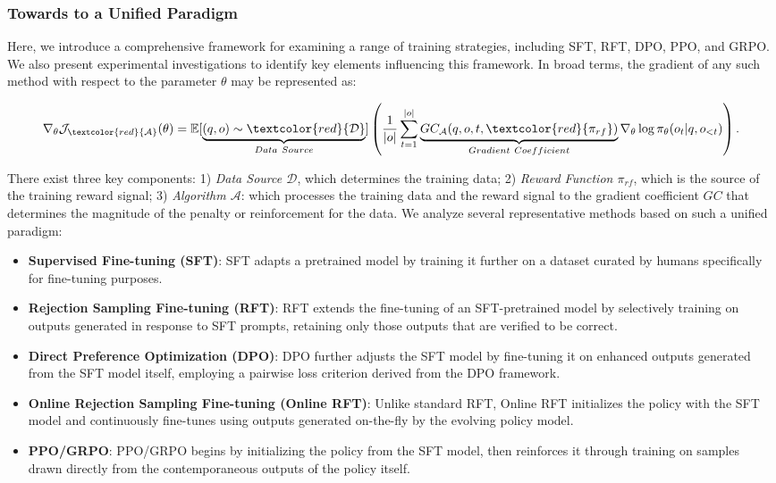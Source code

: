 \begin{itemize}[topsep=0pt]
\subsubsection{Towards to a Unified Paradigm} Here, we introduce a comprehensive framework for examining a range of training strategies, including SFT, RFT, DPO, PPO, and GRPO. We also present experimental investigations to identify key elements influencing this framework. In broad terms, the gradient of any such method with respect to the parameter $\theta$ may be represented as:

\begin{equation}
    \nabla_{\theta}\mathcal{J}_{\textcolor{red}{\mathcal{A}}}(\theta) = \mathbb{E}[\underbrace{(q,o) \sim \textcolor{red}{\mathcal{D}}}_{Data \ Source}]\left( \frac{1}{|o|} \sum_{t=1}^{|o|}  \underbrace{GC_{{\mathcal{A}}}(q, o, t, \textcolor{red}{\pi_{{rf}}})}_{Gradient \ Coefficient}  \nabla_{\theta}\log \pi_{\theta}(o_t | q, o_{<t})\right).
\label{eq:objective}
\end{equation}

There exist three key components: 1) \textit{Data Source $\mathcal{D}$}, which determines the training data; 2) \textit{Reward Function $\pi_{{rf}}$}, which is the source of the training reward signal; 3) \textit{Algorithm $\mathcal{A}$}: which processes the training data and the reward signal to the gradient coefficient $GC$ that determines the magnitude of the penalty or reinforcement for the data. We analyze several representative methods based on such a unified paradigm:

\begin{itemize}
    \item  \textbf{Supervised Fine-tuning (SFT)}: SFT adapts a pretrained model by training it further on a dataset curated by humans specifically for fine-tuning purposes.
    \item \textbf{Rejection Sampling Fine-tuning (RFT)}: RFT extends the fine-tuning of an SFT-pretrained model by selectively training on outputs generated in response to SFT prompts, retaining only those outputs that are verified to be correct.
    \item \textbf{Direct Preference Optimization (DPO)}: DPO further adjusts the SFT model by fine-tuning it on enhanced outputs generated from the SFT model itself, employing a pairwise loss criterion derived from the DPO framework.
    \item \textbf{Online Rejection Sampling Fine-tuning (Online RFT)}: Unlike standard RFT, Online RFT initializes the policy with the SFT model and continuously fine-tunes using outputs generated on-the-fly by the evolving policy model.
    \item \textbf{PPO/GRPO}: PPO/GRPO begins by initializing the policy from the SFT model, then reinforces it through training on samples drawn directly from the contemporaneous outputs of the policy itself.
\end{itemize}


\end{itemize}
